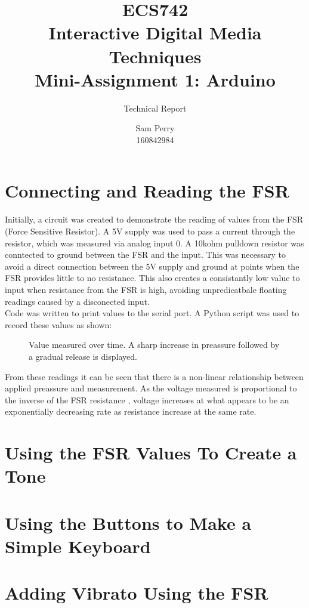 \documentclass[titlepage]{scrartcl}
\begin{document}
    \title{ECS742\\Interactive Digital Media Techniques\\Mini-Assignment 1: Arduino}
    \subtitle{\LARGE{Technical Report}}
    \author{Sam Perry\\160842984}
    \date{}
    \maketitle

    \section{Connecting and Reading the FSR}
    Initially, a circuit was created to demonstrate the reading of values from
    the FSR (Force Sensitive Resistor).  A 5V supply was used to pass a current
    through the resistor, which was measured via analog input 0.  A 10kohm
    pulldown resistor was conntected to ground between the FSR and the input.
    This was necessary to avoid a direct connection between the 5V supply and
    ground at points when the FSR provides little to no resistance. This also
    creates a consistantly low value to input when resistance from the FSR
    is high, avoiding unpredicatbale floating readings caused by a disconected
    input.\\

    Code was written to print values to the serial port. A Python script was
    used to record these values as shown:

    
    \begin{figure}[H]
        \caption{Value measured over time. A sharp increase in preassure followed by a gradual release is displayed.}
    \end{figure}

    From these readings it can be seen that there is a non-linear relationship
    between applied preassure and measurement. As the voltage measured is
    proportional to the inverse of the FSR resistance \parencite{ada2016},
    voltage increases at what appears to be an exponentially decreasing rate as
    resistance increase at the same rate.

    \section{Using the FSR Values To Create a Tone}
    \section{Using the Buttons to Make a Simple Keyboard}
    \section{Adding Vibrato Using the FSR}

    \printbibliography
\end{document}
